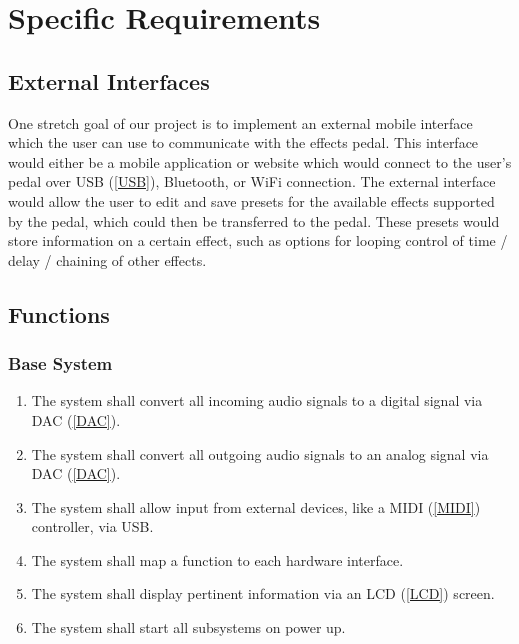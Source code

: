 \section{Specific Requirements}

\subsection{External Interfaces}
One stretch goal of our project is to implement an external mobile interface which the user can use to communicate with the effects pedal. This interface would either be a mobile application or website which would connect to the user's pedal over USB (\ref{USB}), Bluetooth, or WiFi connection. The external interface would allow the user to edit and save presets for the available effects supported by the pedal, which could then be transferred to the pedal. These presets would store information on a certain effect, such as options for looping control of time / delay / chaining of other effects. 

\subsection{Functions}
    \subsubsection{Base System}
    \begin{enumerate}[label=\alph*.]
        \item The system shall convert all incoming audio signals to a digital signal via DAC (\ref{DAC}). %
        \item The system shall convert all outgoing audio signals to an analog signal via DAC (\ref{DAC}).
        \item The system shall allow input from external devices, like a MIDI (\ref{MIDI}) controller, via USB.
        \item The system shall map a function to each hardware interface.
        \item The system shall display pertinent information via an LCD (\ref{LCD}) screen.
        \item The system shall start all subsystems on power up.
    \end{enumerate}
    
